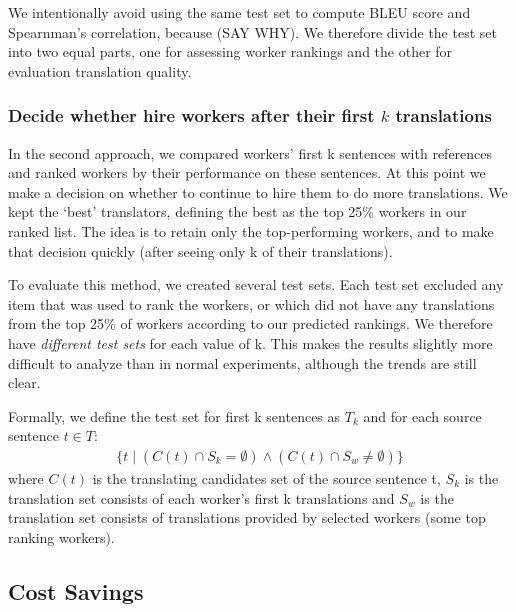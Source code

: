 \documentclass[11pt]{article}
\begin{document}
We intentionally avoid using the same test set to compute BLEU score and Spearnman's correlation, because (SAY WHY).  We therefore divide the test set into two equal parts, one for assessing worker rankings and the other for evaluation translation quality.

\subsubsection{Decide whether hire workers after their first $k$ translations}

In the second approach, we compared workers' first k sentences with references and ranked workers by their performance on these sentences.  At this point we make a decision on whether to continue to hire them to do more translations.  We kept the `best' translators, defining the best as the top 25\% workers in our ranked list.  The idea is to retain only the top-performing workers, and to make that decision quickly (after seeing only k of their translations).  

To evaluate this method, we created several test sets.  Each test set excluded any item that was used to rank the workers, or which did not have any translations from the top 25\% of workers according to our predicted rankings.  We therefore have \emph{different test sets} for each value of k.  This makes the results slightly more difficult to analyze than in normal experiments, although the trends are still clear.

Formally, we define the test set for first k sentences as $T_k$ and for each source sentence $t \in T$:
\begin{align*}
  \{ t \mid (C(t) \cap S_k = \emptyset)   \wedge (C(t) \cap S_w \neq \emptyset)    \}
\end{align*}
where $C(t)$ is the translating candidates set of the source sentence t, $S_k$ is the translation set consists of each worker's first k translations and $S_w$ is the translation set consists of translations provided by selected workers (some top ranking workers).

\subsection{Cost Savings}

\end{document}
